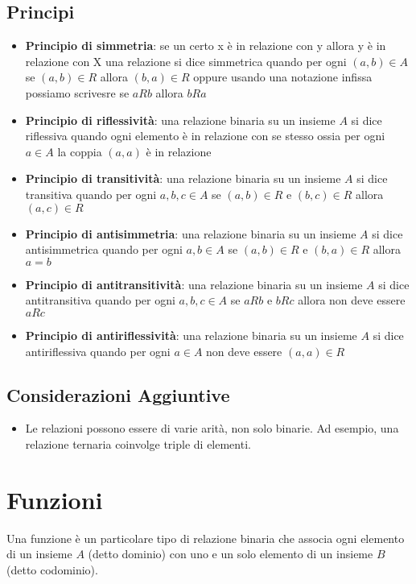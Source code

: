 \documentclass{article}
\begin{document}
\subsection{Principi}
\begin{itemize}
    \item \textbf{Principio di simmetria}: se un certo x è in relazione con y allora y è in relazione con X
    una relazione si dice simmetrica quando per ogni $(a,b) \in A$ se $(a,b)\in R$ allora $(b,a) \in R$
    oppure usando una notazione infissa possiamo scrivesre se $a R b$ allora $b R a$
    \item \textbf{Principio di riflessività}: una relazione binaria su un insieme $A$ si dice riflessiva quando ogni elemento è in relazione con se stesso ossia per ogni $a \in A$ la coppia $(a,a)$ è in relazione
    \item \textbf{Principio di transitività}: una relazione binaria su un insieme $A$ si dice transitiva quando per ogni $a,b,c \in A$ se $(a,b) \in R$ e $(b,c) \in R$ allora $(a,c) \in R$
    \item \textbf{Principio di antisimmetria}: una relazione binaria su un insieme $A$ si dice antisimmetrica quando per ogni $a,b \in A$ se $(a,b) \in R$ e $(b,a) \in R$ allora $a = b$
    \item \textbf{Principio di antitransitività}: una relazione binaria su un insieme $A$ si dice antitransitiva quando per ogni $a,b,c \in A$ se $a R b$ e $b R c$ allora non deve essere $a R c$
    \item \textbf{Principio di antiriflessività}: una relazione binaria su un insieme $A$ si dice antiriflessiva quando per ogni $a \in A$ non deve essere $(a,a) \in R$
\end{itemize}
\subsection{Considerazioni Aggiuntive}
\begin{itemize}
\item Le relazioni possono essere di varie arità, non solo binarie. Ad esempio, una relazione ternaria coinvolge triple di elementi.
\end{itemize}


\newpage
\section{Funzioni}
Una funzione è un particolare tipo di relazione binaria che associa ogni elemento di un insieme $A$ (detto dominio) con uno e un solo elemento di un insieme $B$ (detto codominio).
\end{document}
